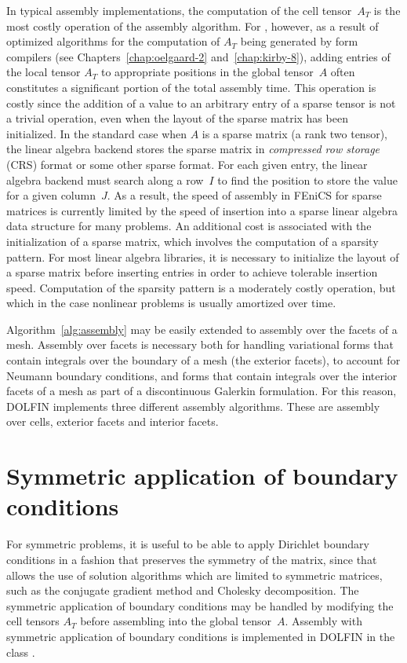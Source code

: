 In typical assembly implementations, the computation of the
cell tensor~$A_T$ is the most costly operation of the assembly
algorithm. For \dolfin{}, however, as a result of optimized algorithms
for the computation of $A_T$ being generated by form compilers (see
Chapters~\ref{chap:oelgaard-2} and~\ref{chap:kirby-8}), adding entries of
the local tensor $A_T$ to appropriate positions in the global tensor~$A$
often constitutes a significant portion of the total assembly time. This
operation is costly since the addition of a value to an arbitrary entry
of a sparse tensor is not a trivial operation, even when the layout of
the sparse matrix has been initialized.  In the standard case when $A$
is a sparse matrix (a rank two tensor), the linear algebra backend stores
the sparse matrix in \emph{compressed row storage} (CRS) format or some
other sparse format. For each given entry, the linear algebra backend
must search along a row~$I$ to find the position to store the value for
a given column~$J$. As a result, the speed of assembly in FEniCS for
sparse matrices is currently limited by the speed of insertion into a
sparse linear algebra data structure for many problems. An additional
cost is associated with the initialization of a sparse matrix, which
involves the computation of a sparsity pattern. For most linear algebra
libraries, it is necessary to initialize the layout of a sparse matrix
before inserting entries in order to achieve tolerable insertion speed.
Computation of the sparsity pattern is a moderately costly operation,
but which in the case nonlinear problems is usually amortized over time.

Algorithm~\ref{alg:assembly} may be easily extended to assembly over
the facets of a mesh. Assembly over facets is necessary both for
handling variational forms that contain integrals over the boundary of
a mesh (the exterior facets), to account for Neumann boundary
conditions, and forms that contain integrals over the interior facets
of a mesh as part of a discontinuous Galerkin formulation. For this
reason, DOLFIN implements three different assembly algorithms. These
are assembly over cells, exterior facets and interior facets.

\section{Symmetric application of boundary conditions}

For symmetric problems, it is useful to be able to apply Dirichlet
boundary conditions in a fashion that preserves the symmetry of the
matrix, since that allows the use of solution algorithms which are
limited to symmetric matrices, such as the conjugate gradient method
and Cholesky decomposition. The symmetric application of boundary
conditions may be handled by modifying the cell tensors $A_T$ before
assembling into the global tensor~$A$. Assembly with symmetric
application of boundary conditions is implemented in DOLFIN in the
class .

